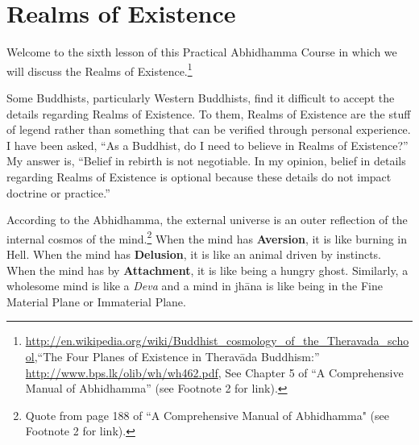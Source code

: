 \section{Realms of Existence}

Welcome to the sixth lesson of this Practical Abhidhamma Course in which we will discuss the Realms of Existence.\footnote{\url{http://en.wikipedia.org/wiki/Buddhist_cosmology_of_the_Theravada_school},\linebreak “The Four Planes of Existence in Theravāda Buddhism:” \url{http://www.bps.lk/olib/wh/wh462.pdf}, See Chapter 5 of “A Comprehensive Manual of Abhidhamma” (see Footnote 2 for link).}

Some Buddhists, particularly Western Buddhists, find it difficult to accept the details regarding Realms of Existence.  To them, Realms of Existence are the stuff of legend rather than something that can be verified through personal experience. I have been asked, “As a Buddhist, do I need to believe in Realms of Existence?” My answer is, “Belief in rebirth is not negotiable. In my opinion, belief in details regarding Realms of Existence is optional because these details do not impact doctrine or practice.”

According to the Abhidhamma, the external universe is an outer reflection of the internal cosmos of the mind.\footnote{Quote from page 188 of “A Comprehensive Manual of Abhidhamma" (see Footnote 2 for link).} When the mind has \textbf{Aversion}, it is like burning in Hell. When the mind has \textbf{Delusion}, it is like an animal driven by instincts. When the mind has by \textbf{Attachment}, it is like being a hungry ghost. Similarly, a wholesome mind is like a \textit{Deva} and a mind in jhāna is like being in the Fine Material Plane or Immaterial Plane.

